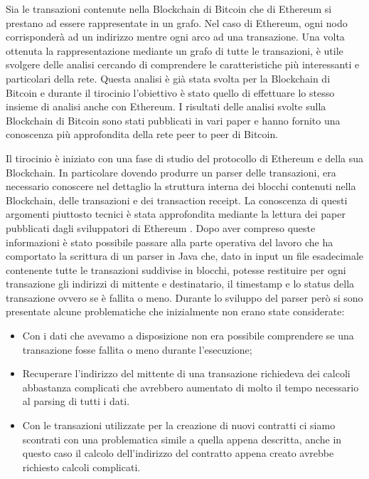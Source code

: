 \documentclass[12pt]{report}
\begin{document}
Sia le transazioni contenute nella Blockchain di Bitcoin che di Ethereum si prestano ad essere rappresentate in un grafo.
Nel caso di Ethereum, ogni nodo corrisponderà ad un indirizzo mentre ogni arco ad una transazione.
Una volta ottenuta la rappresentazione mediante un grafo di tutte le transazioni, è utile svolgere delle analisi cercando di comprendere le caratteristiche più interessanti e particolari della rete.
\newline
Questa analisi è già stata svolta per la Blockchain di Bitcoin e durante il tirocinio l'obiettivo è stato quello di effettuare lo stesso insieme di analisi anche con Ethereum.
I risultati delle analisi svolte sulla Blockchain di Bitcoin sono stati pubblicati in vari paper \cite{maesa2016uncovering} \cite{maesa2016analysis} \cite{maesa2017data} \cite{maesa2017detecting}
e hanno fornito una conoscenza più approfondita della rete peer to peer di Bitcoin.


Il tirocinio è iniziato con una fase di studio del protocollo di Ethereum e della sua Blockchain. 
In particolare dovendo produrre un parser delle transazioni, era necessario conoscere nel dettaglio la struttura interna dei blocchi contenuti nella Blockchain, delle transazioni e dei transaction receipt.
La conoscenza di questi argomenti piuttosto tecnici è stata approfondita mediante la lettura dei paper pubblicati dagli sviluppatori di Ethereum \cite{YellowPaper}.
\newline
Dopo aver compreso queste informazioni è stato possibile passare alla parte operativa del lavoro che ha comportato la scrittura di un parser in Java che, dato in input un file esadecimale contenente tutte le transazioni suddivise in blocchi, potesse restituire per ogni transazione gli indirizzi di mittente e destinatario, il timestamp e lo status della transazione ovvero se è fallita o meno.
Durante lo sviluppo del parser però si sono presentate alcune problematiche che inizialmente non erano state considerate:

\begin{itemize}
    \item Con i dati che avevamo a disposizione non era possibile comprendere se una transazione fosse fallita o meno durante l'esecuzione;
    \item Recuperare l'indirizzo del mittente di una transazione richiedeva dei calcoli abbastanza complicati che avrebbero aumentato di molto il tempo necessario al parsing di tutti i dati.
    \item Con le transazioni utilizzate per la creazione di nuovi contratti ci siamo scontrati con una problematica simile a quella appena descritta, anche in questo caso il calcolo dell'indirizzo del contratto appena creato avrebbe richiesto calcoli complicati.
\end{itemize}
\end{document}
